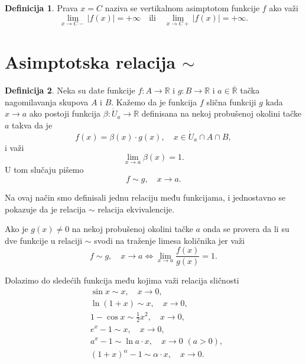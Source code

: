 \documentclass[a4paper,12pt]{article}
\theoremstyle{plain}
\theoremstyle{definition}
\newtheorem{definition}{Definicija}[section]
\theoremstyle{remark}
\begin{document}
\begin{definition}
Prava $x = C$ naziva se vertikalnom asimptotom funkcije $f$ ako važi
$$\lim_{x \to C-} |f(x)| = +\infty \quad \text{ili} \quad \lim_{x \to C+} |f(x)| = +\infty.$$
\end{definition}

\section{Asimptotska relacija \texorpdfstring{$\sim$}{\textasciitilde}}

\begin{definition}
Neka su date funkcije $f : A \rightarrow \mathbb{R}$ i $g : B \rightarrow \mathbb{R}$ i $a \in \overline{\mathbb{R}}$ tačka nagomilavanja skupova $A$ i $B$. Kažemo da je funkcija $f$ slična funkciji $g$ kada $x \to a$ ako postoji funkcija $\beta : \dot{U}_a \rightarrow \mathbb{R}$ definisana na nekoj probušenoj okolini tačke $a$ takva da je
$$f(x) = \beta(x) \cdot g(x), \quad x \in \dot{U}_a \cap A \cap B,$$
i važi
$$\lim_{x \to a} \beta(x) = 1.$$
U tom slučaju pišemo
$$f \sim g, \quad x \to a.$$
\end{definition}

Na ovaj način smo definisali jednu relaciju među funkcijama, i jednostavno se pokazuje da je relacija $\sim$ relacija ekvivalencije.

Ako je $g(x) \neq 0$ na nekoj probušenoj okolini tačke $a$ onda se provera da li su dve funkcije u relaciji $\sim$ svodi na traženje limesa količnika jer važi
$$f \sim g, \quad x \to a \iff \lim_{x \to a} \frac{f(x)}{g(x)} = 1.$$

Dolazimo do sledećih funkcija među kojima važi relacija sličnosti
\begin{equation}
\begin{aligned}
    &\sin x \sim x, \quad x \to 0, \\
    &\ln(1 + x) \sim x, \quad x \to 0, \\
    &1 - \cos x \sim \frac{1}{2}x^2, \quad x \to 0, \\
    &e^x - 1 \sim x, \quad x \to 0, \\
    &a^x - 1 \sim \ln a \cdot x, \quad x \to 0 \,\, (a > 0), \\
    &(1 + x)^\alpha - 1 \sim \alpha \cdot x, \quad x \to 0.
\end{aligned}
\end{equation}
\end{document}
